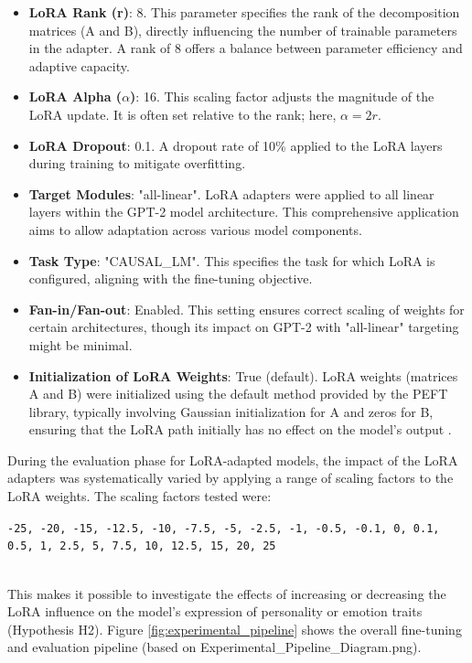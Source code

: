 \documentclass{DESSThesis}
\begin{document}
\begin{itemize}
    \item \textbf{LoRA Rank (r)}: 8. This parameter specifies the rank of the decomposition matrices (A and B), directly influencing the number of trainable parameters in the adapter. A rank of 8 offers a balance between parameter efficiency and adaptive capacity.
    \item \textbf{LoRA Alpha ($\alpha$)}: 16. This scaling factor adjusts the magnitude of the LoRA update. It is often set relative to the rank; here, $\alpha = 2r$.
\item \textbf{LoRA Dropout}: 0.1. A dropout rate of 10\% applied to the LoRA layers during training to mitigate overfitting.
    \item \textbf{Target Modules}: "all-linear". LoRA adapters were applied to all linear layers within the GPT-2 model architecture. This comprehensive application aims to allow adaptation across various model components.
    \item \textbf{Task Type}: "CAUSAL\_LM". This specifies the task for which LoRA is configured, aligning with the fine-tuning objective.
    \item \textbf{Fan-in/Fan-out}: Enabled. This setting ensures correct scaling of weights for certain architectures, though its impact on GPT-2 with "all-linear" targeting might be minimal.
    \item \textbf{Initialization of LoRA Weights}: True (default). LoRA weights (matrices A and B) were initialized using the default method provided by the PEFT library, typically involving Gaussian initialization for A and zeros for B, ensuring that the LoRA path initially has no effect on the model's output \cite{hu_lora_2021}.
\end{itemize}
During the evaluation phase for LoRA-adapted models, the impact of the LoRA adapters was systematically varied by applying a range of scaling factors to the LoRA weights. The scaling factors tested were:
\begin{center}
\begin{minipage}{0.9\linewidth}
\centering
\texttt{-25, -20, -15, -12.5, -10, -7.5, -5, -2.5, -1, -0.5, -0.1, 0, 0.1, 0.5, 1, 2.5, 5, 7.5, 10, 12.5, 15, 20, 25}
\end{minipage}
\end{center}
\\
This makes it possible to investigate the effects of increasing or decreasing the LoRA influence on the model's expression of personality or emotion traits (Hypothesis H2). Figure \ref{fig:experimental_pipeline} shows the overall fine-tuning and evaluation pipeline (based on Experimental\_Pipeline\_Diagram.png).
\end{document}
